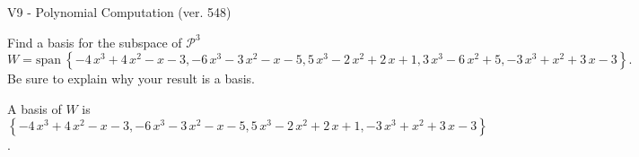 \begin{exercise}
  \begin{exerciseTitle}V9 - Polynomial Computation (ver. 548)\end{exerciseTitle}
  \begin{exerciseStatement}
    Find a basis for the subspace of \(\mathcal{P}^3\) 
\[W=\mathrm{span}\ \left\{-4 \, x^{3} + 4 \, x^{2} - x - 3 , -6 \, x^{3} - 3 \, x^{2} - x - 5 , 5 \, x^{3} - 2 \, x^{2} + 2 \, x + 1 , 3 \, x^{3} - 6 \, x^{2} + 5 , -3 \, x^{3} + x^{2} + 3 \, x - 3\right\}.\]
 Be sure to explain why your result is a basis.


  \end{exerciseStatement}
  \begin{exerciseAnswer}
   A basis of \(W\) is  \(\left\{-4 \, x^{3} + 4 \, x^{2} - x - 3 , -6 \, x^{3} - 3 \, x^{2} - x - 5 , 5 \, x^{3} - 2 \, x^{2} + 2 \, x + 1 , -3 \, x^{3} + x^{2} + 3 \, x - 3\right\}\).
  


  \end{exerciseAnswer}
\end{exercise}